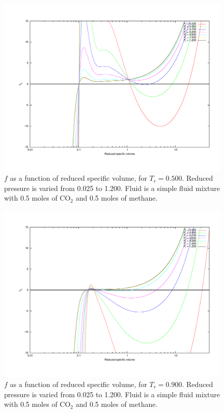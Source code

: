 \documentclass[internal,english]{sintefmemo2012}
\numberwithin{equation}{section}
\begin{document}
\begin{figure}[h]
  \centering
  \includegraphics[trim = 1.5cm 2cm 0 1cm, clip = true, width=14cm]{05Tc_3}
  \caption{$f$ as a function of reduced specific volume, for $T_r = 0.500$. Reduced pressure is varied from 0.025 to 1.200. Fluid is a simple fluid mixture with 0.5 moles of CO$_2$ and 0.5 moles of methane.}
  \label{fig:0.5Tc}
\end{figure}

\begin{figure}[h]
  \centering
  \includegraphics[trim = 1.5cm 2cm 0 1cm, clip = true, width=14cm]{09Tc_3}
  \caption{$f$ as a function of reduced specific volume, for $T_r = 0.900$. Reduced pressure is varied from 0.025 to 1.200. Fluid is a simple fluid mixture with 0.5 moles of CO$_2$ and 0.5 moles of methane.}
  \label{fig:0.9Tc}
\end{figure}
\end{document}
